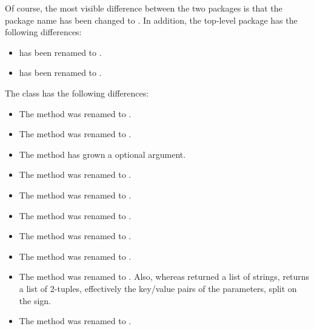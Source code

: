 Of course, the most visible difference between the two packages is
that the package name has been changed to .  In
addition, the top-level package has the following differences:

\begin{itemize}
\item {} has been renamed to
      .

\item {} has been renamed to
      .

\end{itemize}

The  class has the following differences:

\begin{itemize}
\item The method  was renamed to .

\item The method  was renamed to
      .

\item The  method has grown a 
      optional argument.

\item The method  was renamed to .

\item The method  was renamed to .

\item The method  was renamed to .

\item The method  was renamed to
      .

\item The method  was renamed to
      .

\item The method  was renamed to
      .
      Also, whereas  returned a list of strings,
       returns a list of 2-tuples, effectively
      the key/value pairs of the parameters, split on the \character{=}
      sign.

\item The method  was renamed to .


\end{itemize}
